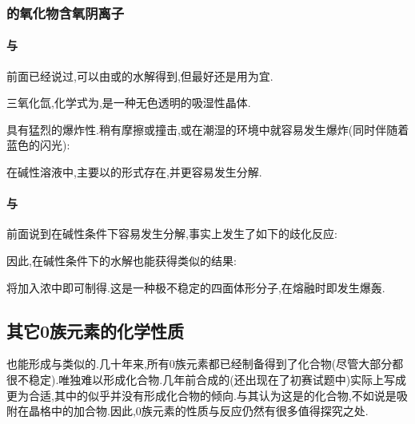 \documentclass{ctexart}
\begin{document}
\subsubsection{的氧化物含氧阴离子}
\paragraph{与}
前面已经说过,可以由或的水解得到,但最好还是用为宜.
\begin{substance}[\ce{XeO3}]
    三氧化氙,化学式为,是一种无色透明的吸湿性晶体.
\end{substance}
具有猛烈的爆炸性.稍有摩擦或撞击,或在潮湿的环境中就容易发生爆炸(同时伴随着蓝色的闪光):
\begin{center}
\end{center}
在碱性溶液中,主要以的形式存在,并更容易发生分解.
\paragraph{与}
前面说到在碱性条件下容易发生分解,事实上发生了如下的歧化反应:
\begin{center}
\end{center}
因此,在碱性条件下的水解也能获得类似的结果:
\begin{center}
\end{center}
将加入浓中即可制得.这是一种极不稳定的四面体形分子,在熔融时即发生爆轰.
\subsection{其它0族元素的化学性质}
也能形成与类似的.几十年来,所有0族元素都已经制备得到了化合物(尽管大部分都很不稳定).唯独难以形成化合物.几年前合成的(还出现在了初赛试题中)实际上写成更为合适,其中的似乎并没有形成化合物的倾向.与其认为这是的化合物,不如说是吸附在晶格中的加合物.因此,0族元素的性质与反应仍然有很多值得探究之处.
\end{document}
